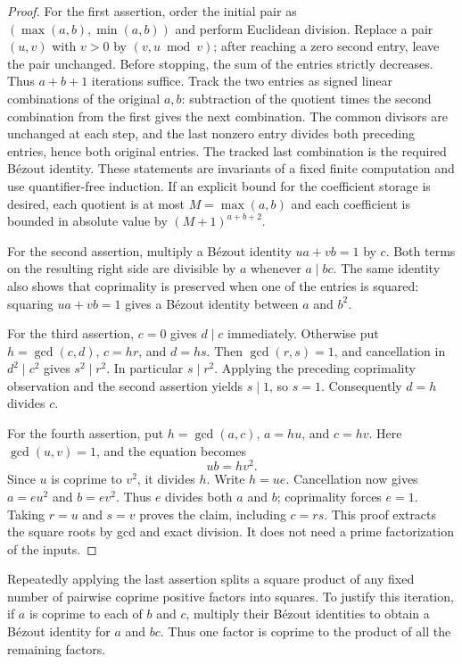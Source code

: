 \begin{proof}
For the first assertion, order the initial pair as
$(\max(a,b),\min(a,b))$ and perform Euclidean division.  Replace a pair
$(u,v)$ with $v>0$ by $(v,u\bmod v)$; after reaching a zero second entry,
leave the pair unchanged.  Before stopping, the sum of the entries strictly
decreases.  Thus $a+b+1$ iterations suffice.  Track the two entries as signed
linear combinations of the original $a,b$: subtraction of the quotient times
the second combination from the first gives the next combination.  The common
divisors are unchanged at each step, and the last nonzero entry divides both
preceding entries, hence both original entries.  The tracked last combination
is the required B\'ezout identity.  These statements are invariants of a fixed
finite computation and use quantifier-free induction.  If an explicit bound
for the coefficient storage is desired, each quotient is at most
$M=\max(a,b)$ and each coefficient is bounded in absolute value by
$(M+1)^{a+b+2}$.

For the second assertion, multiply a B\'ezout identity $ua+vb=1$ by $c$.
Both terms on the resulting right side are divisible by $a$ whenever
$a\mid bc$.  The same identity also shows that coprimality is preserved when
one of the entries is squared: squaring $ua+vb=1$ gives a B\'ezout identity
between $a$ and $b^2$.

For the third assertion, $c=0$ gives $d\mid c$ immediately. Otherwise
put $h=\gcd(c,d)$, $c=hr$, and $d=hs$.
Then $\gcd(r,s)=1$, and cancellation in $d^2\mid c^2$ gives $s^2\mid r^2$.
In particular $s\mid r^2$.  Applying the preceding coprimality observation
and the second assertion yields $s\mid1$, so $s=1$.  Consequently $d=h$ divides
$c$.

For the fourth assertion, put $h=\gcd(a,c)$, $a=hu$, and $c=hv$.
Here $\gcd(u,v)=1$, and the equation becomes
\[
 ub=hv^2.
\]
Since $u$ is coprime to $v^2$, it divides $h$.  Write $h=ue$.  Cancellation
now gives $a=e u^2$ and $b=e v^2$.  Thus $e$ divides both $a$ and $b$;
coprimality forces $e=1$.  Taking $r=u$ and $s=v$ proves the claim, including
$c=rs$.  This proof extracts the square roots by gcd and exact division.
It does not need a prime factorization of the inputs.
\end{proof}

Repeatedly applying the last assertion splits a square product of any fixed
number of pairwise coprime positive factors into squares.  To justify this
iteration, if $a$ is coprime to each of $b$ and $c$, multiply their B\'ezout
identities to obtain a B\'ezout identity for $a$ and $bc$.  Thus one factor is
coprime to the product of all the remaining factors.

